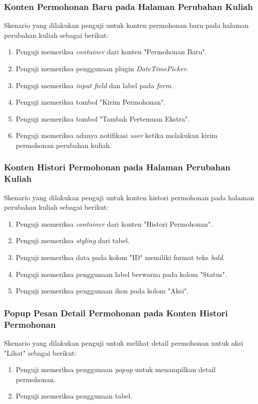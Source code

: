 \subsubsection{Konten Permohonan Baru pada Halaman Perubahan Kuliah}
Skenario yang dilakukan penguji untuk konten permohonan baru pada halaman perubahan kuliah sebagai berikut:
\begin{enumerate}
	\item Penguji memeriksa \textit{container} dari konten "Permohonan Baru".
	\item Penguji memeriksa penggunaan plugin \textit{DateTimePicker}.
	\item Penguji memeriksa \textit{input field} dan label pada \textit{form}.
	\item Penguji memeriksa tombol "Kirim Permohonan".	
	\item Penguji memeriksa tombol "Tambah Pertemuan Ekstra".
	\item Penguji memeriksa adanya notifikasi \textit{user} ketika melakukan kirim permohonan perubahan kuliah.
\end{enumerate}

\subsubsection{Konten Histori Permohonan pada Halaman Perubahan Kuliah}
Skenario yang dilakukan penguji untuk konten histori permohonan pada halaman perubahan kuliah sebagai berikut:
\begin{enumerate}
	\item Penguji memeriksa \textit{container} dari konten "Histori Permohonan".
	\item Penguji memeriksa \textit{styling} dari tabel.	
	\item Penguji memeriksa data pada kolom "ID" memiliki format teks \textit{bold}.
	\item Penguji memeriksa penggunaan label berwarna pada kolom "Status".			
	\item Penguji memeriksa penggunaan ikon pada kolom "Aksi".
\end{enumerate}

\subsubsection{Popup Pesan Detail Permohonan pada Konten Histori Permohonan}
Skenario yang dilakukan penguji untuk melihat detail permohonan untuk aksi "Lihat" sebagai berikut:
\begin{enumerate}
	\item Penguji memeriksa penggunaan \textit{popup} untuk menampilkan detail permohonan.
	\item Penguji memeriksa penggunaan tabel.	
\end{enumerate}

